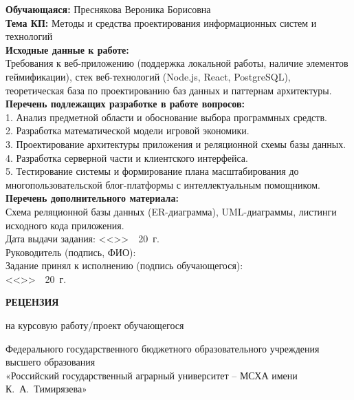 \documentclass[a4paper,14pt]{extreport}
\begin{document}
\vspace{1.5mm}
\noindent\textbf{Обучающаяся:} Преснякова Вероника Борисовна\\[1.5mm]
\noindent\textbf{Тема КП:} Методы и средства проектирования информационных систем и технологий\\[2mm]
\noindent\textbf{Исходные данные к работе:}\\
Требования к веб-приложению (поддержка локальной работы, наличие элементов геймификации), стек веб-технологий (Node.js, React, PostgreSQL), теоретическая база по проектированию баз данных и паттернам архитектуры.\\[2mm]
\noindent\textbf{Перечень подлежащих разработке в работе вопросов:}\\
1. Анализ предметной области и обоснование выбора программных средств.\\
2. Разработка математической модели игровой экономики.\\
3. Проектирование архитектуры приложения и реляционной схемы базы данных.\\
4. Разработка серверной части и клиентского интерфейса.\\
5. Тестирование системы и формирование плана масштабирования до многопользовательской блог-платформы с интеллектуальным помощником.\\[2mm]
\noindent\textbf{Перечень дополнительного материала:}\\
Схема реляционной базы данных (ER-диаграмма), UML-диаграммы, листинги исходного кода приложения.\\[3.5mm]
\noindent Дата выдачи задания: \mbox{<<\underline{\hspace{8mm}}>> \underline{\hspace{28mm}} 20\underline{\hspace{6mm}}~г.}\\[3mm]
\noindent Руководитель (подпись, ФИО): \underline{\hspace{65mm}}\\[3mm]
\noindent Задание принял к исполнению (подпись обучающегося): \underline{\hspace{35mm}}\\[2mm]
\null\hfill\mbox{<<\underline{\hspace{8mm}}>> \underline{\hspace{28mm}} 20\underline{\hspace{6mm}}~г.}

\newpage
\thispagestyle{empty}
\begin{center}
  {\fontsize{14pt}{17pt}\selectfont\bfseries РЕЦЕНЗИЯ\par}
  \vspace{1mm}
  {\fontsize{12pt}{15pt}\selectfont на курсовую работу/проект обучающегося\par}
  \vspace{1mm}
  {\fontsize{11pt}{14pt}\selectfont Федерального государственного бюджетного образовательного учреждения высшего образования\\
  «Российский государственный аграрный университет -- МСХА имени К.~А.~Тимирязева»\par}
\end{center}
\end{document}
